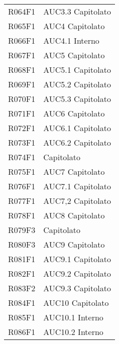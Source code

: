 \documentclass[../analisi-dei-requisiti.tex]{subfiles}
\begin{document}
\begin{longtable}[H]{ p{4cm} | p{4cm} }
  R064F1                               & AUC3.3 Capitolato             \\
  R065F1                               & AUC4 Capitolato               \\
  R066F1                               & AUC4.1 Interno                \\
  R067F1                               & AUC5 Capitolato               \\
  R068F1                               & AUC5.1 Capitolato             \\
  R069F1                               & AUC5.2 Capitolato             \\
  R070F1                               & AUC5.3 Capitolato             \\
  R071F1                               & AUC6 Capitolato               \\
  R072F1                               & AUC6.1 Capitolato             \\
  R073F1                               & AUC6.2 Capitolato             \\
  R074F1                               & Capitolato                    \\
  R075F1                               & AUC7 Capitolato               \\
  R076F1                               & AUC7.1 Capitolato             \\
  R077F1                               & AUC7,2 Capitolato             \\
  R078F1                               & AUC8 Capitolato               \\
  R079F3                               & Capitolato                    \\
  R080F3                               & AUC9 Capitolato               \\
  R081F1                               & AUC9.1 Capitolato             \\
  R082F1                               & AUC9.2 Capitolato             \\
  R083F2                               & AUC9.3 Capitolato             \\
  R084F1                               & AUC10 Capitolato              \\
  R085F1                               & AUC10.1 Interno               \\
  R086F1                               & AUC10.2 Interno               \\

\end{longtable}
\end{document}
